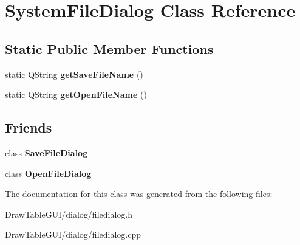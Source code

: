 \hypertarget{classSystemFileDialog}{}\section{System\+File\+Dialog Class Reference}
\label{classSystemFileDialog}
\subsection*{Static Public Member Functions}
\begin{DoxyCompactItemize}
\item 
\hypertarget{classSystemFileDialog_afa5ce52357cc9f1aa613e4fcbdf08421}{}static Q\+String {\bfseries get\+Save\+File\+Name} ()\label{classSystemFileDialog_afa5ce52357cc9f1aa613e4fcbdf08421}

\item 
\hypertarget{classSystemFileDialog_ae7346dbcfb958c6ccdd0e3d9f19e6fbf}{}static Q\+String {\bfseries get\+Open\+File\+Name} ()\label{classSystemFileDialog_ae7346dbcfb958c6ccdd0e3d9f19e6fbf}

\end{DoxyCompactItemize}
\subsection*{Friends}
\begin{DoxyCompactItemize}
\item 
\hypertarget{classSystemFileDialog_af52acc589194c503416995ef3f91ab76}{}class {\bfseries Save\+File\+Dialog}\label{classSystemFileDialog_af52acc589194c503416995ef3f91ab76}

\item 
\hypertarget{classSystemFileDialog_a3b54a5ecf11f2ad25e963fd98614b589}{}class {\bfseries Open\+File\+Dialog}\label{classSystemFileDialog_a3b54a5ecf11f2ad25e963fd98614b589}

\end{DoxyCompactItemize}


The documentation for this class was generated from the following files\+:\begin{DoxyCompactItemize}
\item 
Draw\+Table\+G\+U\+I/dialog/filedialog.\+h\item 
Draw\+Table\+G\+U\+I/dialog/filedialog.\+cpp\end{DoxyCompactItemize}
